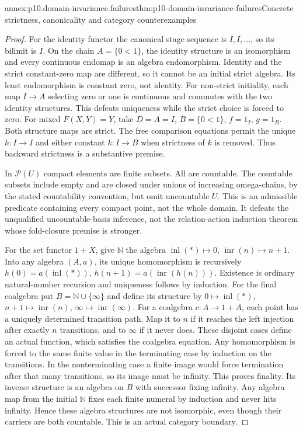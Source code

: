 \begin{annexitem}{annex:p10.domain-invariance.failures}{thm:p10-domain-invariance-failures}{Concrete strictness, canonicality and category counterexamples}
\begin{proof}
For the identity functor the canonical stage sequence is
\(I,I,\ldots\), so its bilimit is \(I\). On the chain
\(A=\{0<1\}\), the identity structure is an isomorphism
and every continuous endomap is an algebra endomorphism.
Identity and the strict constant-zero map are different,
so it cannot be an initial strict algebra. Its least
endomorphism is constant zero, not identity.
For non-strict initiality, each map \(I\to A\) selecting
zero or one is continuous and commutes with the two identity
structures. This defeats uniqueness while the strict choice
is forced to zero.
For mixed \(F(X,Y)=Y\), take \(D=A=I\), \(B=\{0<1\}\),
\(f=1_I\), \(g=1_B\). Both structure maps are strict.
The free comparison equations permit the unique \(h:I\to I\)
and either constant \(k:I\to B\) when strictness of \(k\)
is removed. Thus backward strictness is a substantive premise.

In \(\mathcal P(U)\) compact elements are finite subsets.
All are countable. The countable subsets include empty and
are closed under unions of increasing omega-chains, by the
stated countability convention, but omit uncountable \(U\).
This is an admissible predicate containing every compact
point, not the whole domain. It defeats the unqualified
uncountable-basis inference, not the relation-action induction
theorem whose fold-closure premise is stronger.

For the set functor \(1+X\), give \(\mathbb N\) the algebra
\(\operatorname{inl}(*)\mapsto0\),
\(\operatorname{inr}(n)\mapsto n+1\).
Into any algebra \((A,a)\), its unique homomorphism is
recursively \(h(0)=a(\operatorname{inl}(*))\),
\(h(n+1)=a(\operatorname{inr}(h(n)))\). Existence is ordinary
natural-number recursion and uniqueness follows by induction.
For the final coalgebra put \(B=\mathbb N\cup\{\infty\}\)
and define its structure by
\(0\mapsto\operatorname{inl}(*)\),
\(n+1\mapsto\operatorname{inr}(n)\),
\(\infty\mapsto\operatorname{inr}(\infty)\).
For a coalgebra \(c:A\to1+A\), each point has a uniquely
determined transition path. Map it to \(n\) if it reaches
the left injection after exactly \(n\) transitions, and to
\(\infty\) if it never does. These disjoint cases define
an actual function, which satisfies the coalgebra equation.
Any homomorphism is forced to the same finite value in the
terminating case by induction on the transitions. In the
nonterminating case a finite image would force termination
after that many transitions, so its image must be infinity.
This proves finality. Its inverse structure is an algebra
on \(B\) with successor fixing infinity. Any algebra map
from the initial \(\mathbb N\) fixes each finite numeral
by induction and never hits infinity. Hence these algebra
structures are not isomorphic, even though their carriers
are both countable. This is an actual category boundary.
\end{proof}
\end{annexitem}
